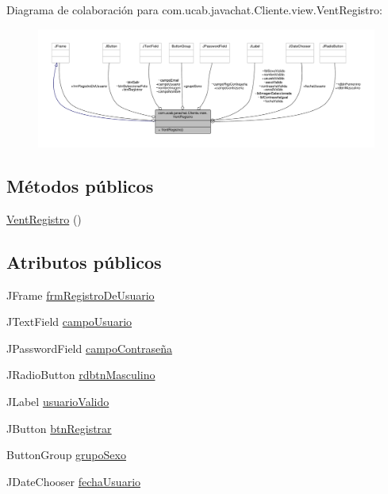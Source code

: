 Diagrama de colaboración para com.\-ucab.\-javachat.\-Cliente.\-view.\-Vent\-Registro\-:\nopagebreak
\begin{figure}[H]
\begin{center}
\leavevmode
\includegraphics[width=350pt]{classcom_1_1ucab_1_1javachat_1_1_cliente_1_1view_1_1_vent_registro__coll__graph}
\end{center}
\end{figure}
\subsection*{Métodos públicos}
\begin{DoxyCompactItemize}
\item 
\hyperlink{classcom_1_1ucab_1_1javachat_1_1_cliente_1_1view_1_1_vent_registro_afa090a64f6a6a83f682702abc3cf1fa2}{Vent\-Registro} ()
\end{DoxyCompactItemize}
\subsection*{Atributos públicos}
\begin{DoxyCompactItemize}
\item 
J\-Frame \hyperlink{classcom_1_1ucab_1_1javachat_1_1_cliente_1_1view_1_1_vent_registro_ac619d27c8f647974c7aa2b32f2c27a49}{frm\-Registro\-De\-Usuario}
\item 
J\-Text\-Field \hyperlink{classcom_1_1ucab_1_1javachat_1_1_cliente_1_1view_1_1_vent_registro_a5c682f1095f71bd4d1328ac0aeefa27b}{campo\-Usuario}
\item 
J\-Password\-Field \hyperlink{classcom_1_1ucab_1_1javachat_1_1_cliente_1_1view_1_1_vent_registro_a9dd634f9a89cdfe0468fde9045892914}{campo\-Contraseña}
\item 
J\-Radio\-Button \hyperlink{classcom_1_1ucab_1_1javachat_1_1_cliente_1_1view_1_1_vent_registro_a7348a156becf753abdf2a1ccdf2c02a4}{rdbtn\-Masculino}
\item 
J\-Label \hyperlink{classcom_1_1ucab_1_1javachat_1_1_cliente_1_1view_1_1_vent_registro_a2820e50b1732f6c7f325c17ba7d980df}{usuario\-Valido}
\item 
J\-Button \hyperlink{classcom_1_1ucab_1_1javachat_1_1_cliente_1_1view_1_1_vent_registro_aecf0b5e81c2e0310d215762144f09f92}{btn\-Registrar}
\item 
Button\-Group \hyperlink{classcom_1_1ucab_1_1javachat_1_1_cliente_1_1view_1_1_vent_registro_af45d621f85c701f30e64605ab02e1393}{grupo\-Sexo}
\item 
J\-Date\-Chooser \hyperlink{classcom_1_1ucab_1_1javachat_1_1_cliente_1_1view_1_1_vent_registro_a5abb04a5876abd5fd60f69d9e462eb4d}{fecha\-Usuario}
\end{DoxyCompactItemize}


